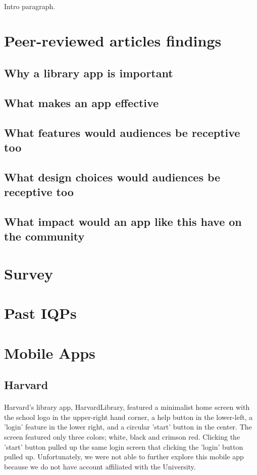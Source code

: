 \paragraph{}
\TODO Intro paragraph.
\paragraph{}
\section{Peer-reviewed articles findings}
\subsection{Why a library app is important}
\subsection{What makes an app effective}
\subsection{What features would audiences be receptive too}
\subsection{What design choices would audiences be receptive too}
\subsection{What impact would an app like this have on the community}

\section{Survey}

\section{Past IQPs}

\section{Mobile Apps}
\subsection{Harvard}
\paragraph{}
Harvard's library app, HarvardLibrary, featured a minimalist home screen with the school logo in the upper-right hand corner, a help button in the lower-left, a 'login' feature in the lower right, and a circular 'start' button in the center. The screen featured only three colors; white, black and crimson red. Clicking the 'start' button pulled up the same login screen that clicking the 'login' button pulled up.  Unfortunately, we were not able to further explore this mobile app because we do not have account affiliated with the University. 
